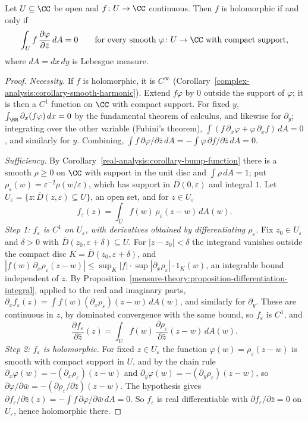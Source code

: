 \begin{proposition}\label{complex-analysis:proposition-weak-cauchy-riemann}
Let $U \subseteq \CC$ be open and $f \colon U \to \CC$ continuous. Then $f$ is holomorphic if and only if
\[
\int_Uf\,\frac{\partial\varphi}{\partial\bar z}\,dA = 0 \qquad \text{for every smooth } \varphi \colon U \to \CC \text{ with compact support,}
\]
where $dA = dx\,dy$ is Lebesgue measure.
\end{proposition}

\begin{proof}
\emph{Necessity.} If $f$ is holomorphic, it is $C^\infty$ (Corollary~\ref{complex-analysis:corollary-smooth-harmonic}). Extend $f\varphi$ by $0$ outside the support of $\varphi$; it is then a $C^1$ function on
$\CC$ with compact support. For fixed $y$, $\int_\RR\partial_x(f\varphi)\,dx = 0$ by the fundamental theorem of calculus, and likewise for $\partial_y$; integrating over the other variable (Fubini's theorem),
$\int(f\,\partial_x\varphi + \varphi\,\partial_xf)\,dA = 0$, and similarly for $y$. Combining, $\int f\,\partial\varphi/\partial\bar z\,dA = -\int\varphi\,\partial f/\partial\bar z\,dA = 0$.

\emph{Sufficiency.} By Corollary~\ref{real-analysis:corollary-bump-function} there is a smooth $\rho \geq 0$ on $\CC$ with support in the unit disc and $\int\rho\,dA = 1$; put $\rho_\varepsilon(w) = \varepsilon^{-2}\rho(w/\varepsilon)$,
which has support in $\overline{D}(0, \varepsilon)$ and integral $1$. Let $U_\varepsilon = \{z : \overline{D}(z, \varepsilon) \subseteq U\}$, an open set, and for $z \in U_\varepsilon$
\[
f_\varepsilon(z) = \int_Uf(w)\,\rho_\varepsilon(z - w)\,dA(w).
\]
\emph{Step 1: $f_\varepsilon$ is $C^1$ on $U_\varepsilon$, with derivatives obtained by differentiating $\rho_\varepsilon$.} Fix $z_0 \in U_\varepsilon$ and $\delta > 0$ with $\overline{D}(z_0, \varepsilon + \delta) \subseteq U$.
For $|z - z_0| < \delta$ the integrand vanishes outside the compact disc $K = \overline{D}(z_0, \varepsilon + \delta)$, and $|f(w)\,\partial_x\rho_\varepsilon(z - w)| \leq \sup_K|f| \cdot \sup|\partial_x\rho_\varepsilon| \cdot 1_K(w)$,
an integrable bound independent of $z$. By Proposition~\ref{measure-theory:proposition-differentiation-integral}, applied to the real and imaginary parts, $\partial_xf_\varepsilon(z) = \int f(w)(\partial_x\rho_\varepsilon)(z - w)\,dA(w)$,
and similarly for $\partial_y$. These are continuous in $z$, by dominated convergence with the same bound, so $f_\varepsilon$ is $C^1$, and
\[
\frac{\partial f_\varepsilon}{\partial\bar z}(z) = \int_Uf(w)\,\frac{\partial\rho_\varepsilon}{\partial\bar z}(z - w)\,dA(w).
\]
\emph{Step 2: $f_\varepsilon$ is holomorphic.} For fixed $z \in U_\varepsilon$ the function $\varphi(w) = \rho_\varepsilon(z - w)$ is smooth with compact support in $U$, and by the chain rule
$\partial_x\varphi(w) = -(\partial_x\rho_\varepsilon)(z - w)$ and $\partial_y\varphi(w) = -(\partial_y\rho_\varepsilon)(z - w)$, so $\partial\varphi/\partial\bar w = -(\partial\rho_\varepsilon/\partial\bar z)(z - w)$. The hypothesis gives
$\partial f_\varepsilon/\partial\bar z(z) = -\int f\,\partial\varphi/\partial\bar w\,dA = 0$. So $f_\varepsilon$ is real differentiable with $\partial f_\varepsilon/\partial\bar z = 0$ on $U_\varepsilon$, hence holomorphic there.


\end{proof}
